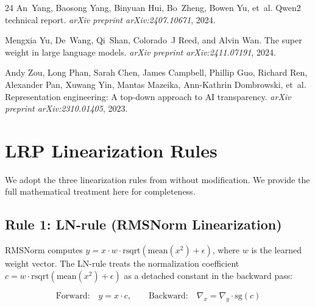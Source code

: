 \documentclass[11pt]{article}
\begin{document}
\begin{thebibliography}{24}
An~Yang, Baosong Yang, Binyuan Hui, Bo~Zheng, Bowen Yu, et~al.
\newblock Qwen2 technical report.
\newblock \emph{arXiv preprint arXiv:2407.10671}, 2024.

Mengxia Yu, De~Wang, Qi~Shan, Colorado~J Reed, and Alvin Wan.
\newblock The super weight in large language models.
\newblock \emph{arXiv preprint arXiv:2411.07191}, 2024.

Andy Zou, Long Phan, Sarah Chen, James Campbell, Phillip Guo, Richard Ren,
  Alexander Pan, Xuwang Yin, Mantas Mazeika, Ann-Kathrin Dombrowski, et~al.
\newblock Representation engineering: A top-down approach to {AI} transparency.
\newblock \emph{arXiv preprint arXiv:2310.01405}, 2023.

\end{thebibliography}


\newpage

\appendix

\section{LRP Linearization Rules}
\label{sec:lrp_appendix}

We adopt the three linearization rules from \citet{arora2025circuits} without modification.
We provide the full mathematical treatment here for completeness.

\subsection{Rule 1: LN-rule (RMSNorm Linearization)}

RMSNorm computes $y = x \cdot w \cdot \text{rsqrt}(\text{mean}(x^2) + \epsilon)$, where $w$ is the learned weight vector.
The LN-rule treats the normalization coefficient $c = w \cdot \text{rsqrt}(\text{mean}(x^2) + \epsilon)$ as a detached constant in the backward pass:

\begin{equation}
    \text{Forward:} \quad y = x \cdot c, \qquad
    \text{Backward:} \quad \nabla_x = \nabla_y \cdot \text{sg}(c)
\label{eq:ln_rule}
\end{equation}
\end{document}
